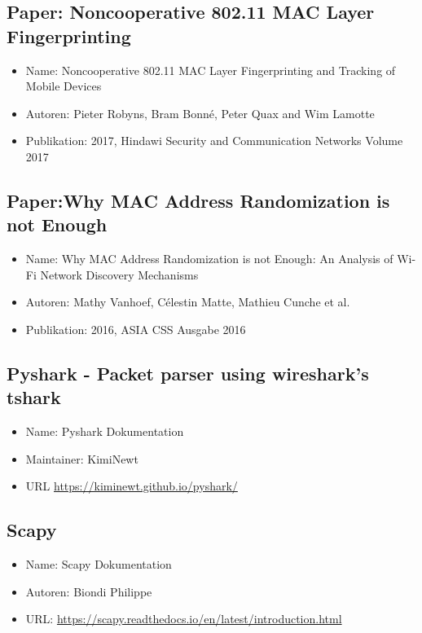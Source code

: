\subsection*{Paper: Noncooperative 802.11 MAC Layer Fingerprinting}
\begin{itemize}
    \item Name: Noncooperative 802.11 MAC Layer Fingerprinting and Tracking
    of Mobile Devices
    \item Autoren: Pieter Robyns, Bram Bonné, Peter Quax and Wim Lamotte
    \item Publikation: 2017, Hindawi Security and Communication Networks Volume 2017
\end{itemize}

\subsection*{Paper:Why MAC Address Randomization is not Enough}
\begin{itemize}
    \item Name: Why MAC Address Randomization is not Enough: 
    An Analysis of Wi-Fi Network Discovery Mechanisms
    \item Autoren: Mathy Vanhoef, Célestin Matte, Mathieu Cunche et al.
    \item Publikation: 2016, ASIA CSS Ausgabe 2016
\end{itemize}

\subsection*{Pyshark - Packet parser using wireshark's tshark}
\begin{itemize}
    \item Name: Pyshark Dokumentation
    \item Maintainer: KimiNewt
    \item URL \url{https://kiminewt.github.io/pyshark/}
\end{itemize}

\subsection*{Scapy}
\begin{itemize}
    \item Name: Scapy Dokumentation
    \item Autoren: Biondi Philippe
    \item URL: \url{https://scapy.readthedocs.io/en/latest/introduction.html}
\end{itemize}

